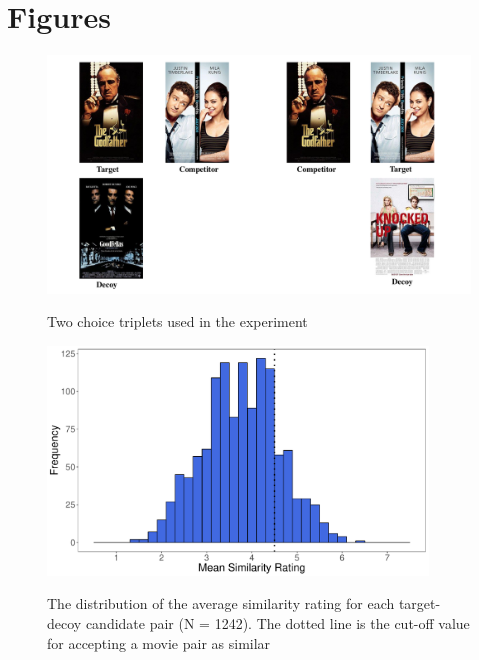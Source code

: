\documentclass[12pt, a4paper]{article}
\begin{document}
\newpage

\section*{Figures}

\begin{figure}[htb!]
\centering
\captionsetup{justification=centering}
		 \caption{Two choice triplets used in the experiment}
\includegraphics[width=1\textwidth]{figure1.pdf}
\label{fig:quadruplets}
\end{figure}
\clearpage

\begin{figure}[htb!]
\centering
\captionsetup{justification=centering}
		\caption{The distribution of the average similarity rating for each target-decoy candidate pair (N = 1242). The dotted line is the cut-off value for accepting a movie pair as similar}
\includegraphics[width=0.9\textwidth]{figure2.pdf}
\label{fig:exp2_pilot}
\end{figure}
\clearpage
\end{document}

